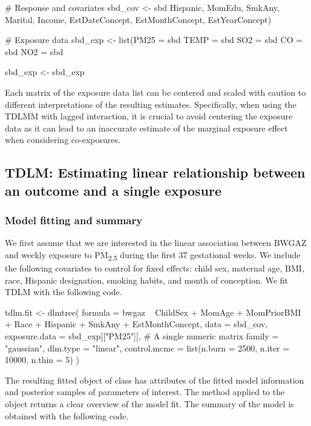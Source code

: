 \begin{example}
# Response and covariates
sbd_cov <- sbd %
                          Hispanic, MomEdu, SmkAny, Marital, Income,
                          EstDateConcept, EstMonthConcept, EstYearConcept)

# Exposure data
sbd_exp <- list(PM25 = sbd %
                TEMP = sbd %
                SO2 = sbd %
                CO = sbd %
                NO2 = sbd %

sbd_exp <- sbd_exp %
\end{example}
Each matrix of the exposure data list can be centered and scaled with caution to different interpretations of the resulting estimates. Specifically, when using the TDLMM with lagged interaction, it is crucial to avoid centering the exposure data as it can lead to an inaccurate estimate of the marginal exposure effect when considering co-exposures.

\subsection{TDLM: Estimating linear relationship between an outcome and a single exposure} \label{ex_tdlm}
\subsubsection{Model fitting and summary}
We first assume that we are interested in the linear association between BWGAZ and weekly exposure to PM\textsubscript{2.5} during the first 37 gestational weeks. We include the following covariates to control for fixed effects: child sex, maternal age, BMI, race, Hispanic designation, smoking habits, and month of conception. We fit TDLM with the following code.

\begin{example}
tdlm.fit <- dlmtree(
    formula = bwgaz ~ ChildSex + MomAge + MomPriorBMI + Race +
                        Hispanic + SmkAny + EstMonthConcept,
    data = sbd_cov,
    exposure.data = sbd_exp[["PM25"]], # A single numeric matrix
    family = "gaussian",
    dlm.type = "linear",
    control.mcmc = list(n.burn = 2500, n.iter = 10000, n.thin = 5)
)
\end{example}
The resulting fitted object of class  has attributes of the fitted model information and posterior samples of parameters of interest. The  method applied to the object  returns a clear overview of the model fit. The summary of the model is obtained with the following code.


